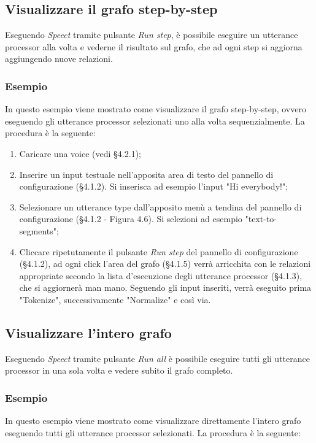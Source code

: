 \documentclass[openany,12pt,a4paper]{report}
\begin{document}
	\subsection{Visualizzare il grafo step-by-step}
	Eseguendo \textit{Speect} tramite pulsante \textit{Run step}, è possibile eseguire un utterance processor alla volta e vederne il risultato sul grafo, che ad ogni step si aggiorna aggiungendo nuove relazioni.
	
	\subsubsection*{Esempio}
	
	In questo esempio viene mostrato come visualizzare il grafo step-by-step, ovvero eseguendo gli utterance processor selezionati uno alla volta sequenzialmente. La procedura è la seguente:
	\begin{enumerate}
		\item Caricare una voice (vedi §4.2.1);
		\item Inserire un input testuale nell'apposita area di testo del pannello di configurazione (§4.1.2). Si inserisca ad esempio l'input "Hi everybody!";
		\item Selezionare un utterance type dall'apposito menù a tendina del pannello di configurazione (§4.1.2 - Figura 4.6). Si selezioni ad esempio "text-to-segments";
		\item Cliccare ripetutamente il pulsante \textit{Run step} del pannello di configurazione (§4.1.2), ad ogni click l'area del grafo (§4.1.5) verrà arricchita con le relazioni appropriate secondo la lista d'esecuzione degli utterance processor (§4.1.3), che si aggiornerà man mano. Seguendo gli input inseriti, verrà eseguito prima "Tokenize", successivamente "Normalize" e così via.
	\end{enumerate}
	
	\subsection{Visualizzare l'intero grafo}
	Eseguendo \textit{Speect} tramite pulsante \textit{Run all} è possibile eseguire tutti gli utterance processor in una sola volta e vedere subito il grafo completo.
	
	\subsubsection*{Esempio}
	
	In questo esempio viene mostrato come visualizzare direttamente l'intero grafo eseguendo tutti gli utterance processor selezionati. La procedura è la seguente:
	
\end{document}
